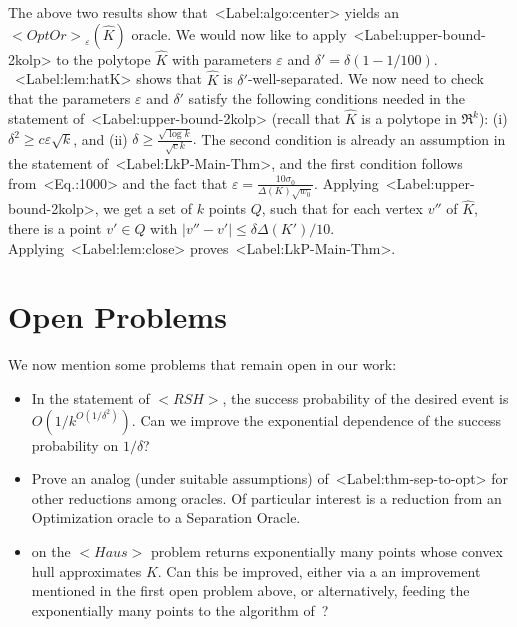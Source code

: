 \documentclass[11pt,letterpaper]{article}
\def\mathsf#1{<#1>}%
\def\xspace{}%
\def\Cref#1{<Label:#1>}%
\def\eqref#1{<Eq.:#1>}%
\theoremstyle{definition}
\theoremstyle{remark}
\newcommand{\Haus}{{\mathsf{Haus}}}
\newcommand{\hatK}{{\widehat K}}
\newcommand{\rsh}{{\mathsf {RSH}}\xspace}
\newcommand{\opto}{{\mathsf{OptOr}}}
\begin{document}
The above two results show that~\Cref{algo:center} yields an  $\opto_\varepsilon(\hatK)$ oracle.  We would now like to apply~\Cref{upper-bound-2kolp} to the polytope $\hatK$ with parameters $\varepsilon$ and $\delta' = \delta(1-1/100).$~\Cref{lem:hatK} shows that $\hatK$ is $\delta'$-well-separated. We now need to check that the parameters $\varepsilon$ and $\delta'$ satisfy the following conditions needed in the statement of~\Cref{upper-bound-2kolp} (recall that $\hatK$ is a polytope in $\Re^k$): (i)  $\delta^2 \geq c \varepsilon \sqrt{k}$, and (ii) $\delta \geq \frac{\sqrt{\log k}}{\sqrt{c} k}.$
The second condition is already an assumption in the statement of~\Cref{LkP-Main-Thm}, and the first condition follows from~\eqref{1000} and the fact that $\varepsilon = \frac{10 \sigma_0}{\Delta(K) \sqrt{w_0}}$. Applying~\Cref{upper-bound-2kolp}, we get a set of $k$ points $Q$, such that for each vertex $v'' $ of $\hatK$, there is a point $v' \in Q$ with $|v''-v'| \leq \delta \Delta(K')/10$. Applying~\Cref{lem:close} proves~\Cref{LkP-Main-Thm}. 

\section{Open Problems}
\label{sec:open}
We now mention some problems that remain open in our work:
\begin{itemize}
    \item[(i)] In the statement of $\rsh$,
    the success probability of the desired event is $O\left(1/k^{O(1/\delta^2)}\right)$. Can we 
    improve the exponential dependence of the success probability on $1/\delta$?
\item[(ii)] Prove an analog (under suitable assumptions) of~\Cref{thm-sep-to-opt} for other reductions among oracles. Of particular interest is a reduction from an Optimization oracle to a Separation Oracle.
\item[(iii)]\Cref{upper-bound-3} on the $\Haus$ problem returns exponentially many points whose convex hull approximates $K$. Can this be improved, either via a an improvement mentioned in the first open problem above, or alternatively, feeding the exponentially many points to the algorithm of~\cite{BlumHR19}? 
\end{itemize}



\end{document}
